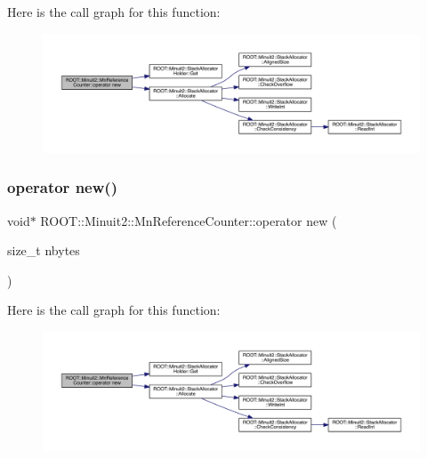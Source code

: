 Here is the call graph for this function\+:
\nopagebreak
\begin{figure}[H]
\begin{center}
\leavevmode
\includegraphics[width=350pt]{dc/da2/classROOT_1_1Minuit2_1_1MnReferenceCounter_af7e9fdee3f67cac68328bbd05f6f2958_cgraph}
\end{center}
\end{figure}
\mbox{\label{classROOT_1_1Minuit2_1_1MnReferenceCounter_af7e9fdee3f67cac68328bbd05f6f2958}} 
\subsubsection{\texorpdfstring{operator new()}{operator new()}\hspace{0.1cm}{\footnotesize\ttfamily [2/2]}}
{\footnotesize\ttfamily void$\ast$ R\+O\+O\+T\+::\+Minuit2\+::\+Mn\+Reference\+Counter\+::operator new (\begin{DoxyParamCaption}\item[{size\+\_\+t}]{nbytes }\end{DoxyParamCaption})\hspace{0.3cm}{\ttfamily [inline]}}

Here is the call graph for this function\+:
\nopagebreak
\begin{figure}[H]
\begin{center}
\leavevmode
\includegraphics[width=350pt]{dc/da2/classROOT_1_1Minuit2_1_1MnReferenceCounter_af7e9fdee3f67cac68328bbd05f6f2958_cgraph}
\end{center}
\end{figure}
\mbox{\label{classROOT_1_1Minuit2_1_1MnReferenceCounter_a6a952f3f15d5dcfa10647c9df13a7caa}} 
